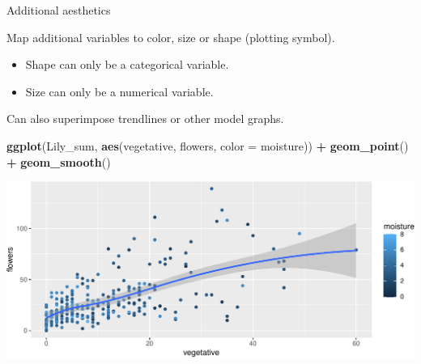\documentclass[
  ignorenonframetext,
]{beamer}
\newenvironment{Shaded}{\begin{snugshade}}{\end{snugshade}}
\newcommand{\DataTypeTok}[1]{\textcolor[rgb]{0.13,0.29,0.53}{#1}}
\newcommand{\KeywordTok}[1]{\textcolor[rgb]{0.13,0.29,0.53}{\textbf{#1}}}
\newcommand{\NormalTok}[1]{#1}
\newcommand{\OperatorTok}[1]{\textcolor[rgb]{0.81,0.36,0.00}{\textbf{#1}}}
\newcommand{\StringTok}[1]{\textcolor[rgb]{0.31,0.60,0.02}{#1}}
\providecommand{\tightlist}{%
  \setlength{\itemsep}{0pt}\setlength{\parskip}{0pt}}
\begin{document}
\begin{frame}[fragile]{Additional aesthetics}
\protect\hypertarget{additional-aesthetics}{}

Map additional variables to color, size or shape (plotting symbol).

\begin{itemize}
\tightlist
\item
  Shape can only be a categorical variable.
\item
  Size can only be a numerical variable.
\end{itemize}

Can also superimpose trendlines or other model graphs.

\scriptsize

\begin{Shaded}
\begin{Highlighting}[]
\KeywordTok{ggplot}\NormalTok{(Lily_sum, }\KeywordTok{aes}\NormalTok{(vegetative, flowers, }\DataTypeTok{color =}\NormalTok{ moisture)) }\OperatorTok{+}\StringTok{ }
\StringTok{  }\KeywordTok{geom_point}\NormalTok{() }\OperatorTok{+}
\StringTok{  }\KeywordTok{geom_smooth}\NormalTok{()}
\end{Highlighting}
\end{Shaded}

\includegraphics{data_viz_files/figure-beamer/unnamed-chunk-7-1.pdf}

\end{frame}
\end{document}
